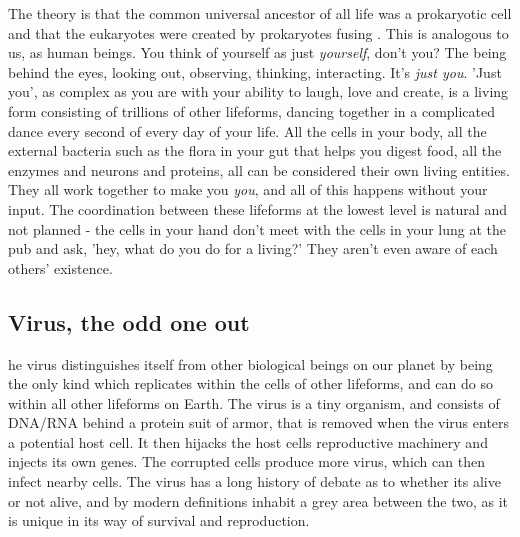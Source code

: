 The theory is that the common universal ancestor of all life was a prokaryotic cell and that the eukaryotes were created by prokaryotes fusing \cite{ProcaEuka}.
This is analogous to us, as human beings. You think of yourself as just \textit {yourself}, don't you? The being behind the eyes, looking out, observing, thinking, interacting.
It's \textit{just you}.
'Just you', as complex as you are with your ability to laugh, love and create, is a living form consisting of trillions of other lifeforms, dancing together in a complicated dance every second of every day of your life.
All the cells in your body, all the external bacteria such as the flora in your gut that helps you digest food, all the enzymes and neurons and proteins, all can be considered their own living entities.
They all work together to make you \textit{you}, and all of this happens without your input.
The coordination between these lifeforms at the lowest level is natural and not planned - the cells in your hand don't meet with the cells in your lung at the pub and ask, 'hey, what do you do for a living?'
They aren't even aware of each others' existence.

\subsection{Virus, the odd one out}

he virus distinguishes itself from other biological beings on our planet by being the only kind which replicates within the cells of other lifeforms, and can do so within all other lifeforms on Earth\cite{koonin}. The virus is a tiny organism, and consists of DNA/RNA behind a protein suit of armor, that is removed when the virus enters a potential host cell. It then hijacks the host cells reproductive machinery and injects its own genes. The corrupted cells produce more virus, which can then infect nearby cells\cite{villareal}. The virus has a long history of debate as to whether its alive or not alive, and by modern definitions inhabit a grey area between the two, as it is unique in its way of survival and reproduction.